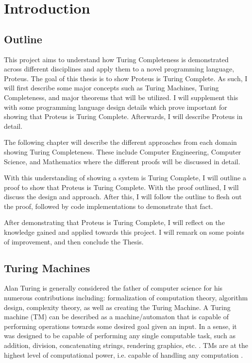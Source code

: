 \chapter{Introduction}\label{chapter:Intro}

\section{Outline}

This project aims to understand how Turing Completeness is demonstrated across different disciplines and apply them to a novel programming language, Proteus.
The goal of this thesis is to show Proteus is Turing Complete.
As such, I will first describe some major concepts such as Turing Machines, Turing Completeness, and major theorems that will be utilized.
I will supplement this with some programming language design details which prove important for showing that Proteus is Turing Complete.
Afterwards, I will describe Proteus in detail.

The following chapter will describe the different approaches from each domain showing Turing Completeness.
These include Computer Engineering, Computer Science, and Mathematics where the different proofs will be discussed in detail.

With this understanding of showing a system is Turing Complete, I will outline a proof to show that Proteus is Turing Complete.
With the proof outlined, I will discuss the design and approach.
After this, I will follow the outline to flesh out the proof, followed by code implementations to demonstrate that fact.

After demonstrating that Proteus is Turing Complete, I will reflect on the knowledge gained and applied towards this project.
I will remark on some points of improvement, and then conclude the Thesis.

\section{Turing Machines}\label{sec:TM}

Alan Turing is generally considered the father of computer science for his numerous contributions including: formalization of computation theory, algorithm design, complexity theory, as well as creating the Turing Machine.
A Turing machine (TM) can be described as a machine/automaton that is capable of performing operations towards some desired goal given an input.
In a sense, it was designed to be capable of performing any single computable task, such as addition, division, concatenating strings, rendering graphics, etc. \cite{TTTTM}.
TMs are at the highest level of computational power, i.e. capable of handling any computation \cite{ShallityAutomataThy}.

